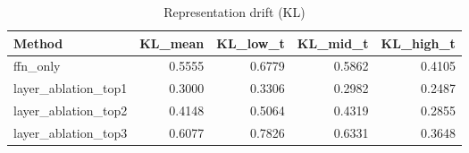 \begin{table}[htbp]
\centering
\caption{Representation drift (KL)}
\label{tab:repr-drift}
\begin{tabular}{lrrrr}
\toprule
\textbf{Method} & \textbf{KL\_mean} & \textbf{KL\_low\_t} & \textbf{KL\_mid\_t} & \textbf{KL\_high\_t} \\
\midrule
ffn\_only & 0.5555 & 0.6779 & 0.5862 & 0.4105 \\
layer\_ablation\_top1 & 0.3000 & 0.3306 & 0.2982 & 0.2487 \\
layer\_ablation\_top2 & 0.4148 & 0.5064 & 0.4319 & 0.2855 \\
layer\_ablation\_top3 & 0.6077 & 0.7826 & 0.6331 & 0.3648 \\
\bottomrule
\end{tabular}
\end{table}